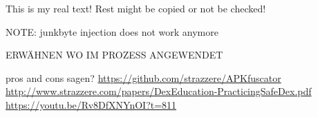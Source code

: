 This is my real text! Rest might be copied or not be checked!


NOTE: junkbyte injection does not work anymore

ERWÄHNEN WO IM PROZESS ANGEWENDET\newline

pros and cons sagen?\newline
\url{https://github.com/strazzere/APKfuscator}\newline
\url{http://www.strazzere.com/papers/DexEducation-PracticingSafeDex.pdf}\newline
\url{https://youtu.be/Rv8DfXNYnOI?t=811}

